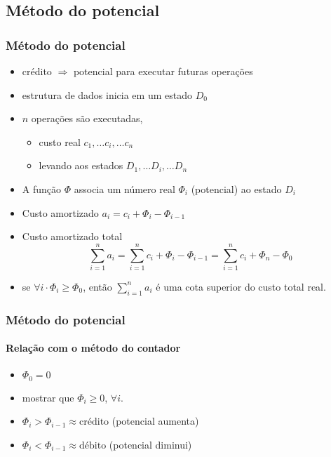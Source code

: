 \documentclass{beamer}
\begin{document}
\subsection{Método do potencial}

\begin{frame}

\frametitle{Método do potencial}

\begin{itemize}

\item crédito $\Longrightarrow$ \alert{potencial} para executar futuras operações

\item estrutura de dados inicia em um estado $D_0$

\item $n$ operações são executadas, 

\begin{itemize}

\item custo real $c_1, \ldots c_i, \ldots c_n$

\item levando aos estados $D_1, \ldots D_i, \ldots D_n$

\end{itemize}

\item A função $\Phi$ associa um número real $\Phi_i$ (potencial) ao estado
  $D_i$

\item \alert{Custo amortizado} $a_i = c_i + \Phi_i - \Phi_{i-1}$

\item Custo amortizado total
$$
\sum_{i=1}^n a_i = \sum_{i=1}^n c_i + \Phi_i - \Phi_{i-1} = \sum_{i=1}^n c_i + \Phi_n - \Phi_0
$$
\item \alert{se $\forall i \cdot \Phi_i \ge \Phi_0$, então $\sum_{i=1}^n a_i$ é uma cota superior do custo total real}.

\end{itemize}

\end{frame}

\begin{frame}

\frametitle{Método do potencial}
\framesubtitle{Relação com o método do contador}

\begin{itemize}

\item $\Phi_0 = 0$

\item mostrar que $\Phi_i \ge 0$, $\forall i$.

\item $\Phi_i > \Phi_{i-1} \approx \text{crédito}$ (potencial aumenta)

\item $\Phi_i < \Phi_{i-1} \approx \text{débito}$ (potencial diminui)

\end{itemize}

\end{frame}
\end{document}
